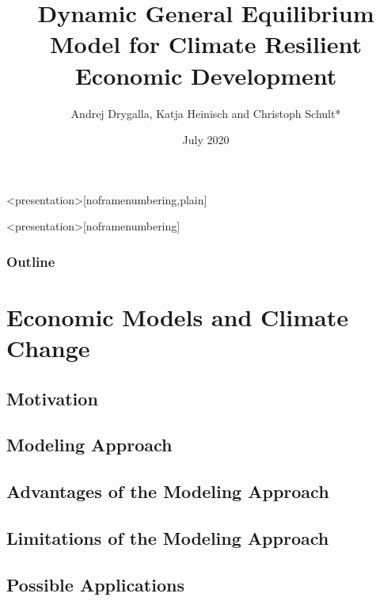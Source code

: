 \documentclass[11pt,aspectratio=169]{beamer}
\title[DGE--CRED]{Dynamic General Equilibrium Model for Climate Resilient Economic Development}
\author[Christoph Schult]{Andrej Drygalla, Katja Heinisch and Christoph Schult*} \date[July 2020]{July 2020}
\institute[IWH]{Halle Institute for Economic Research}
\begin{document}
{}

\begin{frame}<presentation>[noframenumbering,plain]
  \titlepage \\
	{\tiny} 
\end{frame}
\usebackgroundtemplate{
}
\begin{frame}<presentation>[noframenumbering]
	\frametitle{Outline}
		 \tableofcontents[hideallsubsections]
\end{frame}

\section{Economic Models and Climate Change}

\subsection{Motivation}
\subsection{Modeling Approach}
\subsection{Advantages of the Modeling Approach}
\subsection{Limitations of the Modeling Approach}
\subsection{Possible Applications}
\end{document}
